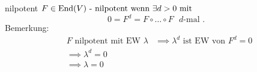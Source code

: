 \documentclass[class=article, crop=false]{standalone}
\begin{document}
\begin{zettel}{nilpotent}
$F \in  \operatorname{End}(V) \text{ - nilpotent wenn } \exists d > 0 \text{ mit }$
\[
    0 = F^{d} = F \circ \dots \circ  F \text{ $d$-mal }
.\]
Bemerkung:
\begin{align*}
    & F \text{ nilpotent mit EW } \lambda  
    & \implies \lambda^d \text{ ist EW von } F^{d} = 0\\
    & \implies \lambda^d = 0\\
    & \implies \lambda  = 0
\end{align*}

\end{zettel}
\end{document}
